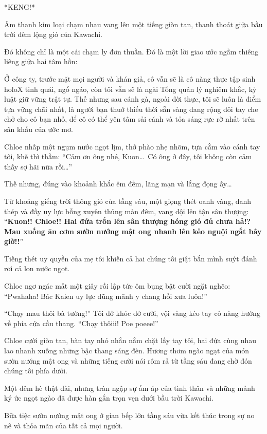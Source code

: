 \documentclass[../main.tex]{subfiles}
\begin{document}
*KENG!*

Âm thanh kim loại chạm nhau vang lên một tiếng giòn tan, thanh thoát giữa bầu trời đêm lộng gió của Kawachi.

Đó không chỉ là một cái chạm ly đơn thuần. Đó là một lời giao ước ngầm thiêng liêng giữa hai tâm hồn:

Ở công ty, trước mặt mọi người và khán giả, cô vẫn sẽ là cô nàng thực tập sinh holoX tinh quái, ngổ ngáo, còn tôi vẫn sẽ là ngài Tổng quản lý nghiêm khắc, kỷ luật giữ vững trật tự. Thế nhưng sau cánh gà, ngoài đời thực, tôi sẽ luôn là điểm tựa vững chãi nhất, là người bạn thuở thiếu thời sẵn sàng dang rộng đôi tay che chở cho cô bạn nhỏ, để cô có thể yên tâm sải cánh và tỏa sáng rực rỡ nhất trên sân khấu của ước mơ.

Chloe nhấp một ngụm nước ngọt lịm, thở phào nhẹ nhõm, tựa cằm vào cánh tay tôi, khẽ thì thầm: ``Cảm ơn ông nhé, Kuon\dots\ Có ông ở đây, tôi không còn cảm thấy sợ hãi nữa rồi\dots''

Thế nhưng, đúng vào khoảnh khắc êm đềm, lãng mạn và lắng đọng ấy\dots

Từ khoảng giếng trời thông gió của tầng sáu, một giọng thét oanh vàng, đanh thép và đầy uy lực bỗng xuyên thủng màn đêm, vang dội lên tận sân thượng: ``\textbf{Kuon!! Chloe!! Hai đứa trốn lên sân thượng hóng gió đủ chưa hả!? Mau xuống ăn cơm sườn nướng mật ong nhanh lên kẻo nguội ngắt bây giờ!!}''

Tiếng thét uy quyền của mẹ tôi khiến cả hai chúng tôi giật bắn mình suýt đánh rơi cả lon nước ngọt.

Chloe ngơ ngác mất một giây rồi lập tức ôm bụng bật cười ngặt nghẽo: ``Pwahaha! Bác Kaien uy lực dũng mãnh y chang hồi xưa luôn!''

``Chạy mau thôi bà tướng!'' Tôi dở khóc dở cười, vội vàng kéo tay cô nàng hướng về phía cửa cầu thang.
``Chạy thôiii! Poe poeee!''

Chloe cười giòn tan, bàn tay nhỏ nhắn nắm chặt lấy tay tôi, hai đứa cùng nhau lao nhanh xuống những bậc thang sáng đèn. Hương thơm ngào ngạt của món sườn nướng mật ong và những tiếng cười nói rôm rả từ tầng sáu đang chờ đón chúng tôi phía dưới.

Một đêm hè thật dài, nhưng tràn ngập sự ấm áp của tình thân và những mảnh ký ức ngọt ngào đã được hàn gắn trọn vẹn dưới bầu trời Kawachi.

\omk

Bữa tiệc sườn nướng mật ong ở gian bếp lớn tầng sáu vừa kết thúc trong sự no nê và thỏa mãn của tất cả mọi người.
\end{document}
